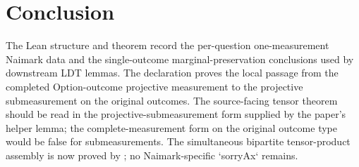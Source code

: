 \documentclass[11pt]{article}
\begin{document}
\section{Conclusion}

The Lean structure  and theorem
 record the per-question one-measurement Naimark
data and the single-outcome marginal-preservation conclusions used by
downstream LDT lemmas.  The declaration
 proves the local passage from the
completed \(\mathrm{Option}\)-outcome projective measurement to the projective
submeasurement on the original outcomes.  The source-facing tensor theorem should be read in the
projective-submeasurement form supplied by the paper's helper lemma; the
complete-measurement form on the original outcome type would be false for
submeasurements.  The simultaneous bipartite tensor-product assembly is now
proved by ; no Naimark-specific
`sorryAx` remains.



\end{document}
